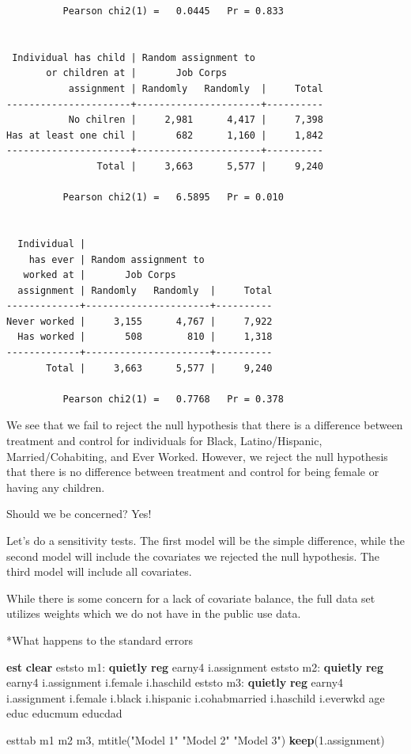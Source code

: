 \documentclass[
]{book}
\newenvironment{Shaded}{\begin{snugshade}}{\end{snugshade}}
\newcommand{\BaseNTok}[1]{\textcolor[rgb]{0.00,0.00,0.81}{#1}}
\newcommand{\KeywordTok}[1]{\textcolor[rgb]{0.13,0.29,0.53}{\textbf{#1}}}
\newcommand{\NormalTok}[1]{#1}
\newcommand{\StringTok}[1]{\textcolor[rgb]{0.31,0.60,0.02}{#1}}
\begin{document}
\begin{verbatim}
          Pearson chi2(1) =   0.0445   Pr = 0.833


 Individual has child | Random assignment to
       or children at |       Job Corps
           assignment | Randomly   Randomly  |     Total
----------------------+----------------------+----------
           No chilren |     2,981      4,417 |     7,398 
Has at least one chil |       682      1,160 |     1,842 
----------------------+----------------------+----------
                Total |     3,663      5,577 |     9,240 

          Pearson chi2(1) =   6.5895   Pr = 0.010


  Individual |
    has ever | Random assignment to
   worked at |       Job Corps
  assignment | Randomly   Randomly  |     Total
-------------+----------------------+----------
Never worked |     3,155      4,767 |     7,922 
  Has worked |       508        810 |     1,318 
-------------+----------------------+----------
       Total |     3,663      5,577 |     9,240 

          Pearson chi2(1) =   0.7768   Pr = 0.378
\end{verbatim}

We see that we fail to reject the null hypothesis that there is a difference between treatment and control for individuals for Black, Latino/Hispanic, Married/Cohabiting, and Ever Worked. However, we reject the null hypothesis that there is no difference between treatment and control for being female or having any children.

Should we be concerned? Yes!

Let's do a sensitivity tests. The first model will be the simple difference, while the second model will include the covariates we rejected the null hypothesis. The third model will include all covariates.

While there is some concern for a lack of covariate balance, the full data set utilizes weights which we do not have in the public use data.

*What happens to the standard errors

\begin{Shaded}
\begin{Highlighting}[]
\KeywordTok{est} \KeywordTok{clear}
\NormalTok{eststo m1: }\KeywordTok{quietly} \KeywordTok{reg}\NormalTok{ earny4 i.assignment}
\NormalTok{eststo m2: }\KeywordTok{quietly} \KeywordTok{reg}\NormalTok{ earny4 i.assignment i.female i.haschild}
\NormalTok{eststo m3: }\KeywordTok{quietly} \KeywordTok{reg}\NormalTok{ earny4 i.assignment i.female i.}\BaseNTok{black}\NormalTok{ i.hispanic i.cohabmarried i.haschild i.everwkd age educ educmum educdad}

\NormalTok{esttab m1 m2 m3, mtitle(}\StringTok{"Model 1"} \StringTok{"Model 2"} \StringTok{"Model 3"}\NormalTok{) }\KeywordTok{keep}\NormalTok{(1.assignment)}
\end{Highlighting}
\end{Shaded}
\end{document}
